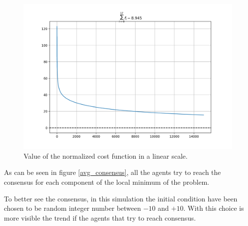 \documentclass[a4paper,11pt,oneside]{book}
\begin{document}
\begin{figure}[ht]
	\centering
	\includegraphics[scale=0.4]{figs/cost_linear_scale}
	\caption{Value of the normalized cost function in a linear scale. }
	\label{lin_cost}
\end{figure}

As can be seen in figure \ref{avg_consensus}, all the agents try to reach the consensus for each component of the local minimum of the problem. 

To better see the consensus, in this simulation the initial condition have been chosen to be random integer number between $-10$ and $+10$. With this choice is more visible the trend if the agents that try to reach consensus.
\end{document}
